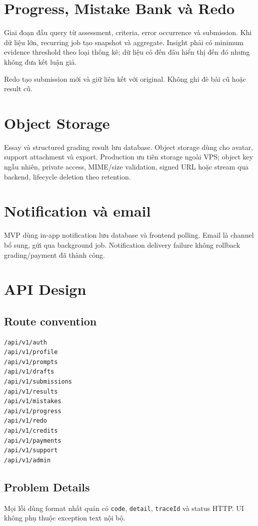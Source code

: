 \documentclass[11pt,a4paper]{article}
\begin{document}
\section{Progress, Mistake Bank và Redo}

Giai đoạn đầu query từ assessment, criteria, error occurrence và submission. Khi dữ liệu lớn, recurring job tạo snapshot và aggregate. Insight phải có minimum evidence threshold theo loại thống kê; dữ liệu có đến đâu hiển thị đến đó nhưng không đưa kết luận giả.

Redo tạo submission mới và giữ liên kết với original. Không ghi đè bài cũ hoặc result cũ.

\section{Object Storage}

Essay và structured grading result lưu database. Object storage dùng cho avatar, support attachment và export. Production ưu tiên storage ngoài VPS; object key ngẫu nhiên, private access, MIME/size validation, signed URL hoặc stream qua backend, lifecycle deletion theo retention.

\section{Notification và email}

MVP dùng in-app notification lưu database và frontend polling. Email là channel bổ sung, gửi qua background job. Notification delivery failure không rollback grading/payment đã thành công.

\section{API Design}

\subsection{Route convention}
\begin{lstlisting}
/api/v1/auth
/api/v1/profile
/api/v1/prompts
/api/v1/drafts
/api/v1/submissions
/api/v1/results
/api/v1/mistakes
/api/v1/progress
/api/v1/redo
/api/v1/credits
/api/v1/payments
/api/v1/support
/api/v1/admin
\end{lstlisting}

\subsection{Problem Details}
Mọi lỗi dùng format nhất quán có \texttt{code}, \texttt{detail}, \texttt{traceId} và status HTTP. UI không phụ thuộc exception text nội bộ.
\end{document}
